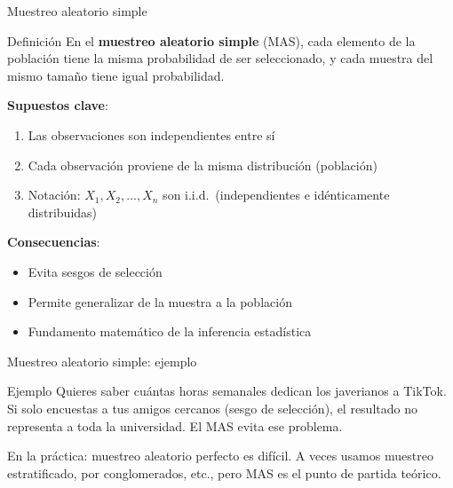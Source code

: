 \documentclass[aspectratio=169, 11pt]{beamer}
\begin{document}
\begin{frame}{Muestreo aleatorio simple}
\begin{block}{Definici\'on}
En el \textbf{muestreo aleatorio simple} (MAS), cada elemento de la poblaci\'on tiene la misma probabilidad de ser seleccionado, y cada muestra del mismo tama\~no tiene igual probabilidad.
\end{block}

\textbf{Supuestos clave}:
\begin{enumerate}
\item Las observaciones son \alert{independientes} entre s\'i
\item Cada observaci\'on proviene de la \alert{misma distribuci\'on} (poblaci\'on)
\item Notaci\'on: $X_1, X_2, \ldots, X_n$ son i.i.d.\ (independientes e id\'enticamente distribuidas)
\end{enumerate}

\vspace{0.5em}
\textbf{Consecuencias}:
\begin{itemize}
\item Evita sesgos de selecci\'on
\item Permite generalizar de la muestra a la poblaci\'on
\item Fundamento matem\'atico de la inferencia estad\'istica
\end{itemize}
\end{frame}

\begin{frame}{Muestreo aleatorio simple: ejemplo}
\begin{exampleblock}{Ejemplo}
Quieres saber cu\'antas horas semanales dedican los javerianos a TikTok. Si solo encuestas a tus amigos cercanos (sesgo de selecci\'on), el resultado no representa a toda la universidad. El MAS evita ese problema.
\end{exampleblock}

\vspace{0.5em}
\alert{En la pr\'actica}: muestreo aleatorio perfecto es dif\'icil. A veces usamos muestreo estratificado, por conglomerados, etc., pero MAS es el punto de partida te\'orico.
\end{frame}
\end{document}
